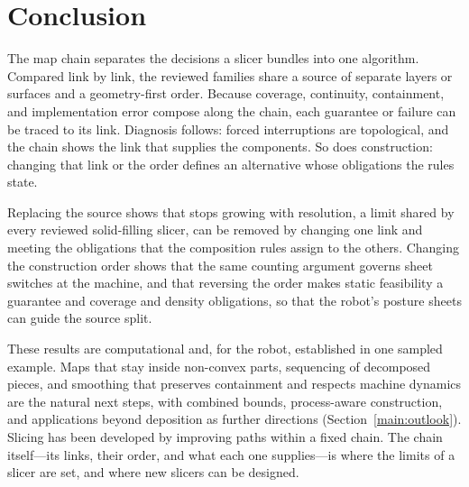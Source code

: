 \section{Conclusion}
\label{main:scope}

The map chain separates the decisions a slicer bundles into one algorithm. Compared link by link, the reviewed families share a source of separate layers or surfaces and a geometry-first order. Because coverage, continuity, containment, and implementation error compose along the chain, each guarantee or failure can be traced to its link. Diagnosis follows: forced interruptions are topological, and the chain shows the link that supplies the components. So does construction: changing that link or the order defines an alternative whose obligations the rules state.

Replacing the source shows that stops growing with resolution, a limit shared by every reviewed solid-filling slicer, can be removed by changing one link and meeting the obligations that the composition rules assign to the others. Changing the construction order shows that the same counting argument governs sheet switches at the machine, and that reversing the order makes static feasibility a guarantee and coverage and density obligations, so that the robot's posture sheets can guide the source split.

These results are computational and, for the robot, established in one sampled example. Maps that stay inside non-convex parts, sequencing of decomposed pieces, and smoothing that preserves containment and respects machine dynamics are the natural next steps, with combined bounds, process-aware construction, and applications beyond deposition as further directions (Section~\ref{main:outlook}). Slicing has been developed by improving paths within a fixed chain. The chain itself---its links, their order, and what each one supplies---is where the limits of a slicer are set, and where new slicers can be designed.
